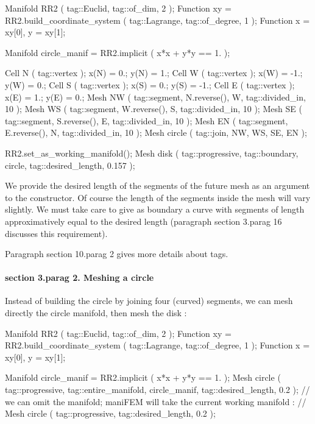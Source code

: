 \verbatim
   Manifold RR2 ( tag::Euclid, tag::of_dim, 2 );
   Function xy = RR2.build_coordinate_system ( tag::Lagrange, tag::of_degree, 1 );
   Function x = xy[0],  y = xy[1];
   
   Manifold circle_manif = RR2.implicit ( x*x + y*y == 1. );
   
   Cell N ( tag::vertex );  x(N) =  0.;   y(N) =  1.;
   Cell W ( tag::vertex );  x(W) = -1.;   y(W) =  0.;
   Cell S ( tag::vertex );  x(S) =  0.;   y(S) = -1.;
   Cell E ( tag::vertex );  x(E) =  1.;   y(E) =  0.;
   Mesh NW ( tag::segment, N.reverse(), W, tag::divided_in, 10 );
   Mesh WS ( tag::segment, W.reverse(), S, tag::divided_in, 10 );
   Mesh SE ( tag::segment, S.reverse(), E, tag::divided_in, 10 );
   Mesh EN ( tag::segment, E.reverse(), N, tag::divided_in, 10 );
   Mesh circle ( tag::join, NW, WS, SE, EN );
   
   RR2.set_as_working_manifold();
   Mesh disk ( tag::progressive, tag::boundary, circle, tag::desired_length, 0.157 );
\endverbatim

We provide the desired length of the segments of the future mesh as an argument to the
constructor.
Of course the length of the segments inside the mesh will vary slightly.
We must take care to give as boundary a curve with segments of length approximatively equal
to the desired length (paragraph \numb section 3.\numb parag 16 discusses this requirement).

Paragraph \numb section 10.\numb parag 2 gives more details about {\codett tag}s.


\paragraph{\numb section 3.\numb parag 2. Meshing a circle}

Instead of building the circle by joining four (curved) segments, we can mesh directly
the circle manifold, then mesh the disk :

\verbatim
   Manifold RR2 ( tag::Euclid, tag::of_dim, 2 );
   Function xy = RR2.build_coordinate_system ( tag::Lagrange, tag::of_degree, 1 );
   Function x = xy[0],  y = xy[1];
   
   Manifold circle_manif = RR2.implicit ( x*x + y*y == 1. );
   Mesh circle ( tag::progressive,
      tag::entire_manifold, circle_manif, tag::desired_length, 0.2 );
   // we can omit the manifold; maniFEM will take the current working manifold :
   // Mesh circle ( tag::progressive, tag::desired_length, 0.2 );
   
